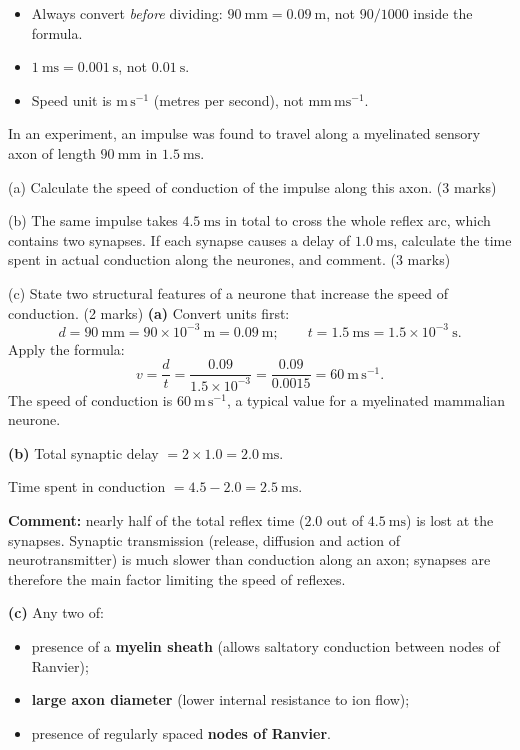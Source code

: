\documentclass[11pt]{article}
\begin{document}
\begin{attention}
\begin{itemize}
\item Always convert \emph{before} dividing: $90\ \mathrm{mm} = 0.09\ \mathrm{m}$, not $90/1000$ inside the formula.
\item $1\ \mathrm{ms} = 0.001\ \mathrm{s}$, not $0.01\ \mathrm{s}$.
\item Speed unit is $\mathrm{m\,s^{-1}}$ (metres per second), not $\mathrm{mm\,ms^{-1}}$.
\end{itemize}
\end{attention}

\begin{exoresolu}
In an experiment, an impulse was found to travel along a myelinated sensory axon of length $90\ \mathrm{mm}$ in $1.5\ \mathrm{ms}$.\par
(a) Calculate the speed of conduction of the impulse along this axon. \hfill (3 marks)\par
(b) The same impulse takes $4.5\ \mathrm{ms}$ in total to cross the whole reflex arc, which contains two synapses. If each synapse causes a delay of $1.0\ \mathrm{ms}$, calculate the time spent in actual conduction along the neurones, and comment. \hfill (3 marks)\par
(c) State two structural features of a neurone that increase the speed of conduction. \hfill (2 marks)
\tcblower
\textbf{(a)} Convert units first:
\[ d = 90\ \mathrm{mm} = 90 \times 10^{-3}\ \mathrm{m} = 0.09\ \mathrm{m}; \qquad t = 1.5\ \mathrm{ms} = 1.5 \times 10^{-3}\ \mathrm{s}. \]
Apply the formula:
\[ v = \frac{d}{t} = \frac{0.09}{1.5 \times 10^{-3}} = \frac{0.09}{0.0015} = 60\ \mathrm{m\,s^{-1}}. \]
The speed of conduction is $\boxed{60\ \mathrm{m\,s^{-1}}}$, a typical value for a myelinated mammalian neurone.\par
\textbf{(b)} Total synaptic delay $= 2 \times 1.0 = 2.0\ \mathrm{ms}$.\par
Time spent in conduction $= 4.5 - 2.0 = 2.5\ \mathrm{ms}$.\par
\textbf{Comment:} nearly half of the total reflex time ($2.0$ out of $4.5\ \mathrm{ms}$) is lost at the synapses. Synaptic transmission (release, diffusion and action of neurotransmitter) is much slower than conduction along an axon; synapses are therefore the main factor limiting the speed of reflexes.\par
\textbf{(c)} Any two of:
\begin{itemize}
\item presence of a \textbf{myelin sheath} (allows saltatory conduction between nodes of Ranvier);
\item \textbf{large axon diameter} (lower internal resistance to ion flow);
\item presence of regularly spaced \textbf{nodes of Ranvier}.
\end{itemize}
\end{exoresolu}
\end{document}
